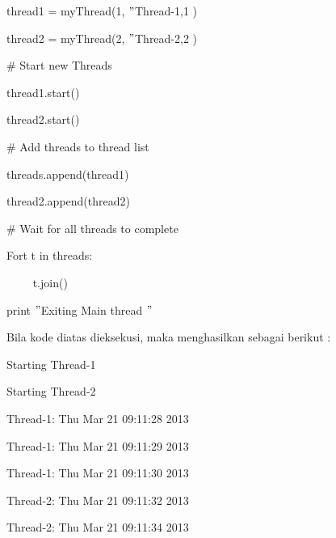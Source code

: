 \documentclass [12pt,a4paper,notitlepage,oneside,bahasa]{article}
\begin{document}
\noindent 
{\fontsize{10pt}{10pt}\selectfont thread1 = myThread(1,  $ " $Thread-1,1 )} \par
\noindent 
{\fontsize{10pt}{10pt}\selectfont thread2 = myThread(2,  $ " $Thread-2,2 )} \par
\vspace{10pt}
\noindent 
{\fontsize{10pt}{10pt}\selectfont  $  \#  $ Start new Threads} \par
\noindent 
{\fontsize{10pt}{10pt}\selectfont thread1.start()} \par
\noindent 
{\fontsize{10pt}{10pt}\selectfont thread2.start()} \par
\vspace{10pt}
\noindent 
{\fontsize{10pt}{10pt}\selectfont  $  \#  $ Add threads to thread list} \par
\noindent 
{\fontsize{10pt}{10pt}\selectfont threads.append(thread1)} \par
\noindent 
{\fontsize{10pt}{10pt}\selectfont thread2.append(thread2)} \par
\vspace{10pt}
\noindent 
{\fontsize{10pt}{10pt}\selectfont  $  \#  $ Wait for all threads to complete} \par
\noindent 
{\fontsize{10pt}{10pt}\selectfont Fort t in threads:} \par
\noindent 
{\fontsize{10pt}{10pt}\selectfont ~~~~ t.join()} \par
\noindent 
{\fontsize{10pt}{10pt}\selectfont print  $ " $Exiting Main thread $ " $} \par
\vspace{10pt}
\noindent 
Bila kode diatas dieksekusi, maka menghasilkan sebagai berikut : \par
\vspace{10pt}
\noindent 
{\fontsize{10pt}{10pt}\selectfont Starting Thread-1} \par
\noindent 
{\fontsize{10pt}{10pt}\selectfont Starting Thread-2} \par
\noindent 
{\fontsize{10pt}{10pt}\selectfont Thread-1: Thu Mar 21 09:11:28 2013} \par
\noindent 
{\fontsize{10pt}{10pt}\selectfont Thread-1: Thu Mar 21 09:11:29 2013} \par
\noindent 
{\fontsize{10pt}{10pt}\selectfont Thread-1: Thu Mar 21 09:11:30 2013} \par
\noindent 
{\fontsize{10pt}{10pt}\selectfont Thread-2: Thu Mar 21 09:11:32 2013} \par
\noindent 
{\fontsize{10pt}{10pt}\selectfont Thread-2: Thu Mar 21 09:11:34 2013} \par
\end{document}
